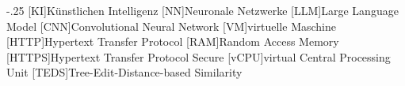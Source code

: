 \documentclass[headsepline,footsepline,footinclude=false,oneside,fontsize=12pt,paper=a4,listof=totoc,bibliography=totoc]{scrbook}
\begin{document}

\frontmatter{}

%
%
%
%

\tableofcontents{}

\mainmatter{}



\appendix{}


\begin{acronym}
	\itemsep-.25\baselineskip
	[KI]{Künstlichen Intelligenz}
	[NN]{Neuronale Netzwerke}
	[LLM]{Large Language Model}
	[CNN]{Convolutional Neural Network}
	[VM]{virtuelle Maschine}
	[HTTP]{Hypertext Transfer Protocol}
	[RAM]{Random Access Memory}
	[HTTPS]{Hypertext Transfer Protocol Secure}
	[vCPU]{virtual Central Processing Unit}
	[TEDS]{Tree-Edit-Distance-based Similarity}
\end{acronym}

\listoffigures{}

\end{document}
